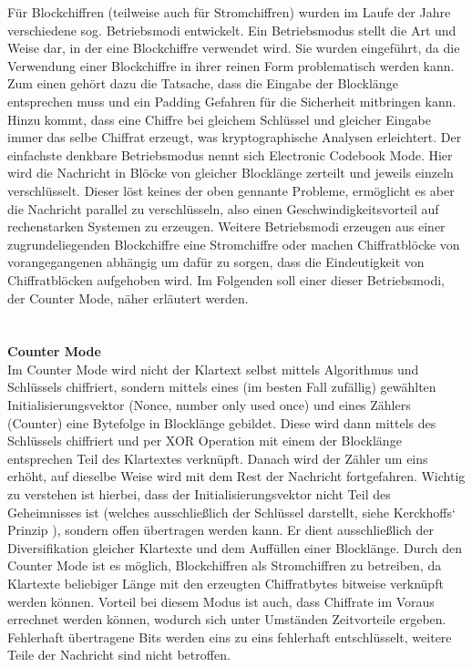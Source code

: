 \documentclass[13pt,a4paper,bibliography=totocnumbered,listof=totocnumbered]{scrartcl}
\begin{document}
Für Blockchiffren (teilweise auch für Stromchiffren) wurden im Laufe der Jahre verschiedene sog. Betriebsmodi entwickelt. Ein Betriebsmodus stellt die Art und Weise dar, in der eine Blockchiffre verwendet wird. Sie wurden eingeführt, da die Verwendung einer Blockchiffre in ihrer reinen Form problematisch werden kann. Zum einen gehört dazu die Tatsache, dass die Eingabe der Blocklänge entsprechen muss und ein Padding Gefahren für die Sicherheit mitbringen kann. Hinzu kommt, dass eine Chiffre bei gleichem Schlüssel und gleicher Eingabe immer das selbe Chiffrat erzeugt, was kryptographische Analysen erleichtert. Der einfachste denkbare Betriebsmodus nennt sich Electronic Codebook Mode. Hier wird die Nachricht in Blöcke von gleicher Blocklänge zerteilt und jeweils einzeln verschlüsselt. Dieser löst keines der oben gennante Probleme, ermöglicht es aber die Nachricht parallel zu verschlüsseln, also einen Geschwindigkeitsvorteil auf rechenstarken Systemen zu erzeugen. Weitere Betriebsmodi erzeugen aus einer zugrundeliegenden Blockchiffre eine Stromchiffre oder machen Chiffratblöcke von vorangegangenen abhängig um dafür zu sorgen, dass die Eindeutigkeit von Chiffratblöcken aufgehoben wird. Im Folgenden soll einer dieser Betriebsmodi, der Counter Mode, näher erläutert werden.\\
\cite[S. 223ff.]{42} \cite[S. 23f.]{13} \cite[S. 88-94]{48}\\
\\\textbf{Counter Mode}\\
Im Counter Mode wird nicht der Klartext selbst mittels Algorithmus und Schlüssels chiffriert, sondern mittels eines (im besten Fall zufällig) gewählten Initialisierungsvektor (Nonce, number only used once) und eines Zählers (Counter) eine Bytefolge in Blocklänge gebildet. Diese wird dann mittels des Schlüssels chiffriert und per XOR Operation mit einem der Blocklänge entsprechen Teil des Klartextes verknüpft. Danach wird der Zähler um eins erhöht, auf dieselbe Weise wird mit dem Rest der Nachricht fortgefahren. Wichtig zu verstehen ist hierbei, dass der Initialisierungsvektor nicht Teil des Geheimnisses ist (welches ausschließlich der Schlüssel darstellt, siehe Kerckhoffs‘ Prinzip \cite[S. 38]{48}), sondern offen übertragen werden kann. Er dient ausschließlich der Diversifikation gleicher Klartexte und dem Auffüllen einer Blocklänge. Durch den Counter Mode ist es möglich, Blockchiffren als Stromchiffren zu betreiben, da Klartexte beliebiger Länge mit den erzeugten Chiffratbytes bitweise verknüpft werden können. Vorteil bei diesem Modus ist auch, dass Chiffrate im Voraus errechnet werden können, wodurch sich unter Umständen Zeitvorteile ergeben. Fehlerhaft übertragene Bits werden eins zu eins fehlerhaft entschlüsselt, weitere Teile der Nachricht sind nicht betroffen.\\
\end{document}
